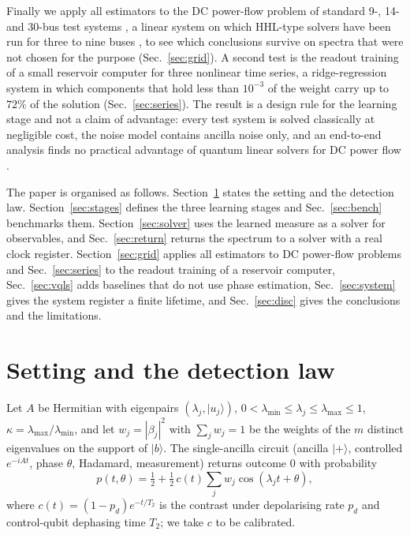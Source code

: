 \documentclass[journal]{IEEEtran}
\newcommand{\lmin}{\lambda_{\min}}
\newcommand{\lmax}{\lambda_{\max}}
\begin{document}
Finally we apply all estimators to the DC power-flow problem of standard 9-, 14- and 30-bus test systems \cite{Zimmerman2011}, a linear system on which HHL-type solvers have been run for three to nine buses \cite{Eskandarpour2020,Eskandarpour2021,GaoPF2022}, to see which conclusions survive on spectra that were not chosen for the purpose (Sec.~\ref{sec:grid}). A second test is the readout training of a small reservoir computer for three nonlinear time series, a ridge-regression system \cite{Wiebe2012,Jaeger2004} in which components that hold less than $10^{-3}$ of the weight carry up to $72\%$ of the solution (Sec.~\ref{sec:series}). The result is a design rule for the learning stage and not a claim of advantage: every test system is solved classically at negligible cost, the noise model contains ancilla noise only, and an end-to-end analysis finds no practical advantage of quantum linear solvers for DC power flow \cite{Pareek2026}.

The paper is organised as follows. Section~\ref{sec:setting} states the setting and the detection law. Section~\ref{sec:stages} defines the three learning stages and Sec.~\ref{sec:bench} benchmarks them. Section~\ref{sec:solver} uses the learned measure as a solver for observables, and Sec.~\ref{sec:return} returns the spectrum to a solver with a real clock register. Section~\ref{sec:grid} applies all estimators to DC power-flow problems and Sec.~\ref{sec:series} to the readout training of a reservoir computer, Sec.~\ref{sec:vqls} adds baselines that do not use phase estimation, Sec.~\ref{sec:system} gives the system register a finite lifetime, and Sec.~\ref{sec:disc} gives the conclusions and the limitations.

\section{Setting and the detection law}
\label{sec:setting}

Let $A$ be Hermitian with eigenpairs $(\lambda_j,|u_j\rangle)$, $0<\lmin\le\lambda_j\le\lmax\le1$, $\kappa=\lmax/\lmin$, and let $w_j=|\beta_j|^2$ with $\sum_jw_j=1$ be the weights of the $m$ distinct eigenvalues on the support of $|b\rangle$. The single-ancilla circuit (ancilla $|+\rangle$, controlled $e^{-iAt}$, phase $\theta$, Hadamard, measurement) returns outcome 0 with probability
\begin{equation}
p(t,\theta)=\tfrac12+\tfrac12\,c(t)\sum_jw_j\cos(\lambda_jt+\theta),
\label{eq:p}
\end{equation}
where $c(t)=(1-p_d)e^{-t/T_2}$ is the contrast under depolarising rate $p_d$ and control-qubit dephasing time $T_2$; we take $c$ to be calibrated.
\end{document}
